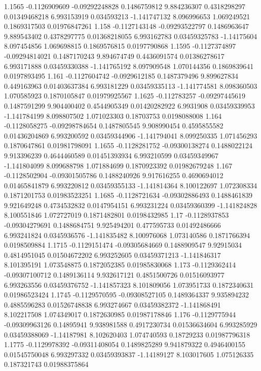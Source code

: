 {1.1565 -0.1126909609 -0.09292248828 0.1486759812 9.884236307 0.4318298297 0.01349468218 6.993153919 0.034593213 -1.141747132 8.096996653 1.069249521 0.1869317503 0.01976847261
1.158 -0.1127143148 -0.09293522797 0.1486963647 9.889543402 0.4378297775 0.01368218055 6.993162783 0.03459325783 -1.14175604 8.097454856 1.069698815 0.1869576815 0.0197790868
1.1595 -0.1127374897 -0.09294814021 0.1487170243 9.894674749 0.4436091574 0.01386278617 6.993171888 0.03459330388 -1.141765192 8.097909548 1.070144356 0.1869839641 0.0197893495
1.161 -0.1127604742 -0.0929612185 0.1487379496 9.899627834 0.449163963 0.01403637384 6.993181229 0.03459335113 -1.141774581 8.098360503 1.070585923 0.1870105847 0.01979925567
1.1625 -0.112783257 -0.09297445619 0.1487591299 9.904400402 0.4544905349 0.01420282922 6.9931908 0.03459339953 -1.141784199 8.098807502 1.071023303 0.18703753 0.0198088008
1.164 -0.1128058275 -0.09298784654 0.1487805545 9.908990454 0.4595855582 0.01436204869 6.993200592 0.03459344906 -1.141794041 8.099250335 1.071456293 0.1870647861 0.01981798091
1.1655 -0.1128281752 -0.09300138274 0.1488022124 9.913396239 0.4644460589 0.01451393934 6.993210599 0.03459349967 -1.141804099 8.099688798 1.071884699 0.1870923392 0.01982679248
1.167 -0.1128502904 -0.09301505786 0.1488240926 9.917616255 0.4690694012 0.01465841879 6.993220812 0.03459355133 -1.141814364 8.100122697 1.072308334 0.1871201753 0.01983523251
1.1685 -0.1128721634 -0.09302886493 0.1488461839 9.921649248 0.4734532832 0.0147954151 6.993231224 0.03459360399 -1.141824828 8.100551846 1.072727019 0.1871482801 0.0198432985
1.17 -0.1128937853 -0.09304279691 0.1488684751 9.925494201 0.477595733 0.01492486666 6.993241824 0.0345936576 -1.141835482 8.100976068 1.073140586 0.1871766394 0.0198509884
1.1715 -0.1129151474 -0.09305684669 0.1488909547 9.92915034 0.4814951045 0.01504672202 6.993252605 0.03459371213 -1.141846317 8.101395191 1.073548875 0.1872052385 0.01985830068
1.173 -0.1129362414 -0.09307100712 0.1489136114 9.932617121 0.4851500726 0.01516093977 6.993263556 0.03459376752 -1.141857323 8.101809056 1.073951733 0.1872340631 0.01986523424
1.1745 -0.1129570595 -0.09308527105 0.1489364337 9.935894232 0.4885596283 0.01526748838 6.993274667 0.03459382372 -1.141868491 8.102217508 1.074349017 0.1872630985 0.01987178846
1.176 -0.1129775944 -0.09309963126 0.14895941 9.938981588 0.4917230734 0.01536634604 6.993285929 0.03459388069 -1.14187981 8.102620403 1.074740593 0.18729233 0.01987796318
1.1775 -0.1129978392 -0.09311408054 0.1489825289 9.941879322 0.4946400155 0.01545750048 6.993297332 0.03459393837 -1.14189127 8.103017605 1.075126335 0.187321743 0.01988375864
}
